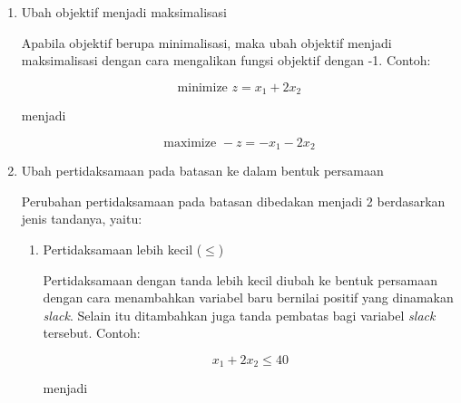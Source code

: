 \begin{enumerate}
	\item Ubah objektif menjadi maksimalisasi
	
		Apabila objektif berupa minimalisasi, maka ubah objektif menjadi maksimalisasi dengan cara mengalikan fungsi objektif dengan -1. Contoh:
	
		\begin{equation*}
			\text{minimize } z = x_1 + 2x_2
		\end{equation*}
		
		menjadi
		
		\begin{equation*}
			\text{maximize } -z = -x_1 - 2x_2
		\end{equation*}
		
	
		
		
		

	\item Ubah pertidaksamaan pada batasan ke dalam bentuk persamaan
	
		Perubahan pertidaksamaan pada batasan dibedakan menjadi 2 berdasarkan jenis tandanya, yaitu:
		
		\begin{enumerate}
			\item Pertidaksamaan lebih kecil (\(\leq\))		

				Pertidaksamaan dengan tanda lebih kecil diubah ke bentuk persamaan dengan cara menambahkan variabel baru bernilai positif yang dinamakan \textit{slack}. Selain itu ditambahkan juga tanda pembatas bagi variabel \textit{slack} tersebut. Contoh:
				
				\begin{equation*}
					x_1 + 2x_2 \leq 40
				\end{equation*}
				
				menjadi
				

\end{enumerate}
\end{enumerate}
